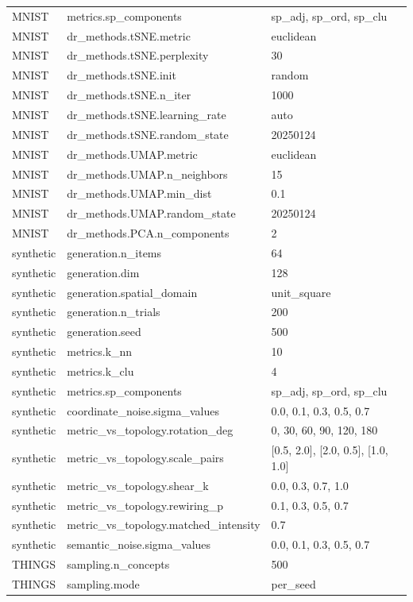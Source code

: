 \begin{table}[h]
\begin{tabular}{lll}
MNIST & metrics.sp\_components & sp\_adj, sp\_ord, sp\_clu \\
MNIST & dr\_methods.tSNE.metric & euclidean \\
MNIST & dr\_methods.tSNE.perplexity & 30 \\
MNIST & dr\_methods.tSNE.init & random \\
MNIST & dr\_methods.tSNE.n\_iter & 1000 \\
MNIST & dr\_methods.tSNE.learning\_rate & auto \\
MNIST & dr\_methods.tSNE.random\_state & 20250124 \\
MNIST & dr\_methods.UMAP.metric & euclidean \\
MNIST & dr\_methods.UMAP.n\_neighbors & 15 \\
MNIST & dr\_methods.UMAP.min\_dist & 0.1 \\
MNIST & dr\_methods.UMAP.random\_state & 20250124 \\
MNIST & dr\_methods.PCA.n\_components & 2 \\
synthetic & generation.n\_items & 64 \\
synthetic & generation.dim & 128 \\
synthetic & generation.spatial\_domain & unit\_square \\
synthetic & generation.n\_trials & 200 \\
synthetic & generation.seed & 500 \\
synthetic & metrics.k\_nn & 10 \\
synthetic & metrics.k\_clu & 4 \\
synthetic & metrics.sp\_components & sp\_adj, sp\_ord, sp\_clu \\
synthetic & coordinate\_noise.sigma\_values & 0.0, 0.1, 0.3, 0.5, 0.7 \\
synthetic & metric\_vs\_topology.rotation\_deg & 0, 30, 60, 90, 120, 180 \\
synthetic & metric\_vs\_topology.scale\_pairs & [0.5, 2.0], [2.0, 0.5], [1.0, 1.0] \\
synthetic & metric\_vs\_topology.shear\_k & 0.0, 0.3, 0.7, 1.0 \\
synthetic & metric\_vs\_topology.rewiring\_p & 0.1, 0.3, 0.5, 0.7 \\
synthetic & metric\_vs\_topology.matched\_intensity & 0.7 \\
synthetic & semantic\_noise.sigma\_values & 0.0, 0.1, 0.3, 0.5, 0.7 \\
THINGS & sampling.n\_concepts & 500 \\
THINGS & sampling.mode & per\_seed \\

\end{tabular}
\end{table}
